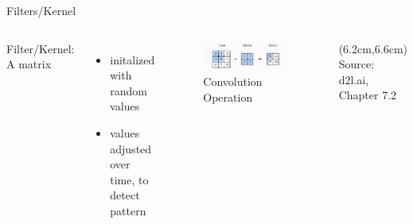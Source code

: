 \documentclass[citestyle=authoryear,bibstyle=numeric,hyperref,backend=biber]{sdqbeamer}
\begin{document}
\begin{frame}{Filters/Kernel}
    \begin{columns}
        Filter/Kernel: A matrix
        \begin{itemize}
            \item initalized with random values
            \item values adjusted over time, to detect pattern
        \end{itemize}

        \begin{figure}
            \centering
            \includegraphics[width=1\textwidth]{pictures/convolution.png}
            \caption{Convolution Operation}
            \label{fig:typical-CNN}
        \end{figure}
         \begin{textblock*}{6cm}(6.2cm,6.6cm) %
             \tiny{Source: d2l.ai, Chapter 7.2}
        \end{textblock*}
    \end{columns}
\end{frame}
\end{document}
